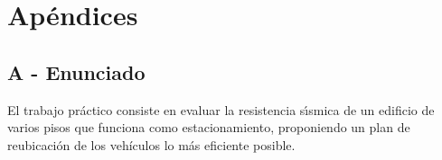 \documentclass[a4paper]{article}
\begin{document}
\newpage

\newpage

\section{Apéndices}
\subsection{A - Enunciado}

El trabajo pr\'actico consiste en evaluar la resistencia s\'\i smica de un
edificio de varios pisos que funciona como estacionamiento, proponiendo un plan de
reubicaci\'on de los veh\'iculos lo m\'as eficiente posible.\\
\end{document}
